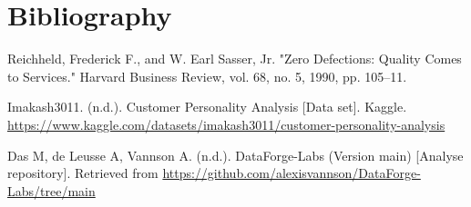 \documentclass[11pt,a4paper]{article}
\begin{document}
\section*{Bibliography}
Reichheld, Frederick F., and W. Earl Sasser, Jr. "Zero Defections: Quality Comes to
Services." Harvard Business Review, vol. 68, no. 5, 1990, pp. 105–11.

Imakash3011. (n.d.). Customer Personality Analysis [Data set]. Kaggle.
\url{https://www.kaggle.com/datasets/imakash3011/customer-personality-analysis}

Das M, de Leusse A, Vannson A. (n.d.). DataForge-Labs (Version main) [Analyse
repository]. Retrieved from \url{https://github.com/alexisvannson/DataForge-Labs/tree/main

}
\end{document}
